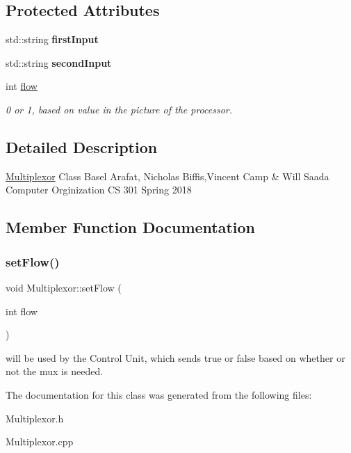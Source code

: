 \subsection*{Protected Attributes}
\begin{DoxyCompactItemize}
\item 
\mbox{\label{class_multiplexor_ae7f24f6e3b1e141c22de77520b55ff36}} 
std\+::string {\bfseries first\+Input}
\item 
\mbox{\label{class_multiplexor_aedb0534a1f3a41bd09136175a80d76b7}} 
std\+::string {\bfseries second\+Input}
\item 
\mbox{\label{class_multiplexor_aa38f2d5057c2c76b799fa66645662b55}} 
int \mbox{\hyperlink{class_multiplexor_aa38f2d5057c2c76b799fa66645662b55}{flow}}
\begin{DoxyCompactList}\small\item\em 0 or 1, based on value in the picture of the processor. \end{DoxyCompactList}\end{DoxyCompactItemize}


\subsection{Detailed Description}
\mbox{\hyperlink{class_multiplexor}{Multiplexor}} Class Basel Arafat, Nicholas Biffis,Vincent Camp \& Will Saada Computer Orginization CS 301 Spring 2018 

\subsection{Member Function Documentation}
\mbox{\label{class_multiplexor_aaf700f773d80deaa3af4cb8aec0f9b41}} 
\subsubsection{\texorpdfstring{set\+Flow()}{setFlow()}}
{\footnotesize\ttfamily void Multiplexor\+::set\+Flow (\begin{DoxyParamCaption}\item[{int}]{flow }\end{DoxyParamCaption})}

will be used by the Control Unit, which sends true or false based on whether or not the mux is needed. 

The documentation for this class was generated from the following files\+:\begin{DoxyCompactItemize}
\item 
Multiplexor.\+h\item 
Multiplexor.\+cpp\end{DoxyCompactItemize}
